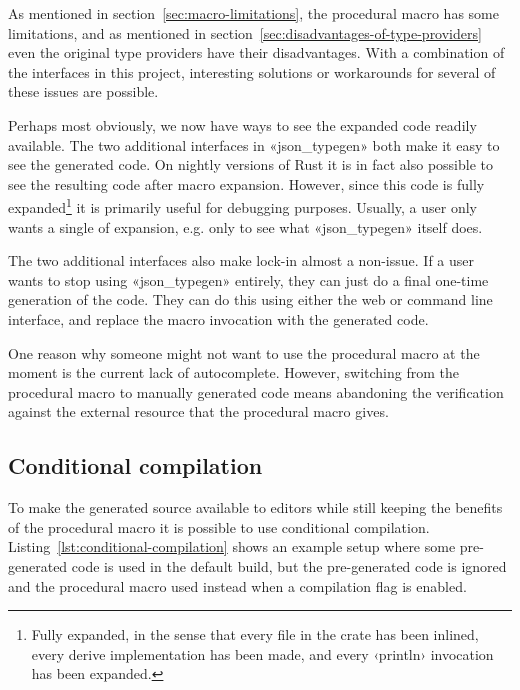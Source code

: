 As mentioned in section~\ref{sec:macro-limitations}, the procedural macro has some limitations, and as mentioned in section~\ref{sec:disadvantages-of-type-providers} even the original type providers have their disadvantages. With a combination of the interfaces in this project, interesting solutions or workarounds for several of these issues are possible.


Perhaps most obviously, we now have ways to see the expanded code readily available. The two additional interfaces in «json_typegen» both make it easy to see the generated code. On nightly versions of Rust it is in fact also possible to see the resulting code after macro expansion. However, since this code is fully expanded\footnote{Fully expanded, in the sense that every file in the crate has been inlined, every derive implementation has been made, and every ‹println› invocation has been expanded.} it is primarily useful for debugging purposes. Usually, a user only wants a single  of expansion, e.g. only to see what «json_typegen» itself does.

The two additional interfaces also make lock-in almost a non-issue. If a user wants to stop using «json_typegen» entirely, they can just do a final one-time generation of the code. They can do this using either the web or command line interface, and replace the macro invocation with the generated code.

One reason why someone might not want to use the procedural macro at the moment is the current lack of autocomplete. However, switching from the procedural macro to manually generated code means abandoning the verification against the external resource that the procedural macro gives.

\subsection{Conditional compilation}


To make the generated source available to editors while still keeping the benefits of the procedural macro it is possible to use conditional compilation. Listing~\ref{lst:conditional-compilation} shows an example setup where some pre-generated code is used in the default build, but the pre-generated code is ignored and the procedural macro used instead when a compilation flag is enabled.

